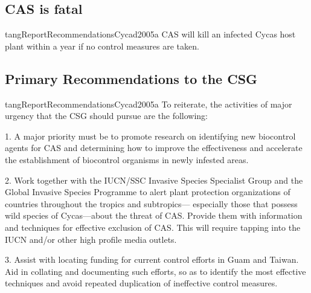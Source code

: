 \documentclass[12pt,letterpaper,english,bibliography=totocnumbered, abstract=on]{scrartcl}
\begin{document}
\begin{appendices}
\subsection{CAS is fatal}

\begin{displaycquote}{tangReportRecommendationsCycad2005a}
CAS will kill an infected Cycas host plant within a year if no control measures
are taken.
\end{displaycquote}

\subsection{Primary Recommendations to the CSG}
\begin{displaycquote}{tangReportRecommendationsCycad2005a}
To reiterate, the activities of major urgency that the CSG should pursue are the following:

1. A major priority must be to promote research on identifying new biocontrol agents for CAS and
determining how to improve the effectiveness and accelerate the establishment of biocontrol organisms
in newly infested areas.

2. Work together with the IUCN/SSC Invasive Species Specialist Group and the Global Invasive Species
Programme to alert plant protection organizations of countries throughout the tropics and subtropics—
especially those that possess wild species of Cycas—about the threat of CAS. Provide them with
information and techniques for effective exclusion of CAS. This will require tapping into the IUCN
and/or other high profile media outlets.

3. Assist with locating funding for current control efforts in Guam and Taiwan. Aid in collating and
documenting such efforts, so as to identify the most effective techniques and avoid repeated
duplication of ineffective control measures.
\end{displaycquote}

\end{appendices}
\end{document}
